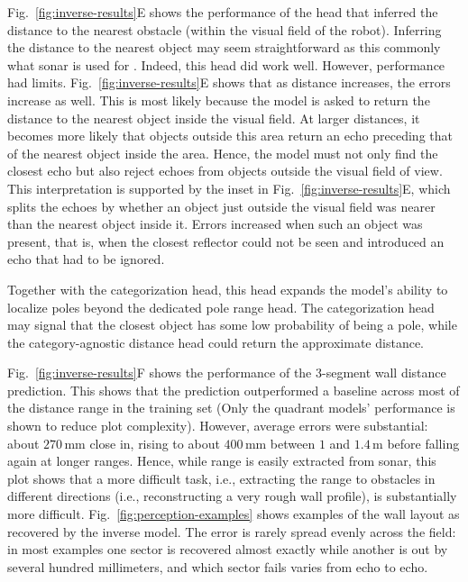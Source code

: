 \documentclass[11pt]{article}
\begin{document}

Fig.~\ref{fig:inverse-results}E shows the performance of the head that inferred the distance to the nearest obstacle (within the visual field of the robot). Inferring the distance to the nearest object may seem straightforward as this commonly what sonar is used for \citep{Peremans2012}. Indeed, this head did work well. However, performance had limits. Fig.~\ref{fig:inverse-results}E shows that as distance increases, the errors increase as well. This is most likely because the model is asked to return the distance to the nearest object inside the visual field. At larger distances, it becomes more likely that objects outside this area return an echo preceding that of the nearest object inside the area. Hence, the model must not only find the closest echo but also reject echoes from objects outside the visual field of view. This interpretation is supported by the inset in Fig.~\ref{fig:inverse-results}E, which splits the echoes by whether an object just outside the visual field was nearer than the nearest object inside it. Errors increased when such an object was present, that is, when the closest reflector could not be seen and introduced an echo that had to be ignored.

Together with the categorization head, this head expands the model’s ability to localize poles beyond the dedicated pole range head. The categorization head may signal that the closest object has some low probability of being a pole, while the category-agnostic distance head could return the approximate distance. 

Fig.~\ref{fig:inverse-results}F shows the performance of the 3-segment wall distance prediction. This shows that the prediction outperformed a baseline across most of the distance range in the training set (Only the quadrant models’ performance is shown to reduce plot complexity). However, average errors were substantial: about $270$\,mm close in, rising to about $400$\,mm between $1$ and $1.4$\,m before falling again at longer ranges.  Hence, while range is easily extracted from sonar, this plot shows that a more difficult task, i.e., extracting the range to obstacles in different directions (i.e., reconstructing a very rough wall profile), is substantially more difficult. Fig.~\ref{fig:perception-examples} shows examples of the wall layout as recovered by the inverse model. The error is rarely spread evenly across the field: in most examples one sector is recovered almost exactly while another is out by several hundred millimeters, and which sector fails varies from echo to echo.
\end{document}

